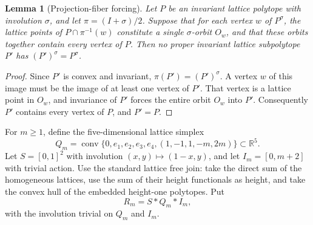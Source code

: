 \documentclass[11pt,a4paper]{article}
\newtheorem{lemma}{Lemma}[section]
\theoremstyle{definition}\newtheorem{definition}[lemma]{Definition}
\theoremstyle{remark}\newtheorem{remark}[lemma]{Remark}
\begin{document}
\begin{lemma}[Projection-fiber forcing]\label{lem:projection-fibers}
Let $P$ be an invariant lattice polytope with involution $\sigma$, and
let $\pi=(I+\sigma)/2$. Suppose that for each vertex $w$ of $P^\sigma$,
the lattice points of $P\cap\pi^{-1}(w)$ constitute a single
$\sigma$-orbit $O_w$, and that these orbits together contain every
vertex of $P$. Then no proper invariant lattice subpolytope $P'$ has
$(P')^\sigma=P^\sigma$.
\end{lemma}
\begin{proof}
Since $P'$ is convex and invariant, $\pi(P')=(P')^\sigma$.
A vertex $w$ of this image must be the image of at least one vertex of
$P'$. That vertex is a lattice point in $O_w$, and invariance of $P'$
forces the entire orbit $O_w$ into $P'$. Consequently $P'$ contains every
vertex of $P$, and $P'=P$.
\end{proof}

For $m\geq1$, define the five-dimensional lattice simplex
\begin{equation}\label{eq:minimal-simplex}
 Q_m=\operatorname{conv}\bigl\{0,e_1,e_2,e_3,e_4,
                   (1,-1,1,-m,2m)\bigr\}\subset\mathbb R^5.
\end{equation}
Let $S=[0,1]^2$ with involution $(x,y)\mapsto(1-x,y)$, and let
$I_m=[0,m+2]$ with trivial action. Use the standard lattice free join:
take the direct sum of the homogeneous lattices, use the sum of their
height functionals as height, and take the convex hull of the embedded
height-one polytopes. Put
\[
 R_m=S*Q_m*I_m,
\]
with the involution trivial on $Q_m$ and $I_m$.
\end{document}
